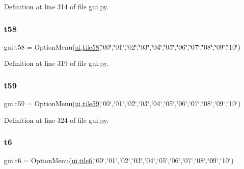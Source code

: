 Definition at line 314 of file gui.\+py.

\mbox{\label{namespacegui_a1b3b256d01a50dc355027775c504ea35}} 
\subsubsection{\texorpdfstring{t58}{t58}}
{\footnotesize\ttfamily gui.\+t58 = Option\+Menu(\mbox{\hyperlink{namespacegui_a40ab7281456eadbea2dc2038f5c24fa1}{ui}},\mbox{\hyperlink{namespacegui_a99c90d661722beb1c379e2d9fc6169a4}{tile58}},\char`\"{}00\char`\"{},\char`\"{}01\char`\"{},\char`\"{}02\char`\"{},\char`\"{}03\char`\"{},\char`\"{}04\char`\"{},\char`\"{}05\char`\"{},\char`\"{}06\char`\"{},\char`\"{}07\char`\"{},\char`\"{}08\char`\"{},\char`\"{}09\char`\"{},\char`\"{}10\char`\"{})}



Definition at line 319 of file gui.\+py.

\mbox{\label{namespacegui_a380d67606f2286d1725df8cdc4caad7a}} 
\subsubsection{\texorpdfstring{t59}{t59}}
{\footnotesize\ttfamily gui.\+t59 = Option\+Menu(\mbox{\hyperlink{namespacegui_a40ab7281456eadbea2dc2038f5c24fa1}{ui}},\mbox{\hyperlink{namespacegui_a841a445f892ff85a173e8562fe380797}{tile59}},\char`\"{}00\char`\"{},\char`\"{}01\char`\"{},\char`\"{}02\char`\"{},\char`\"{}03\char`\"{},\char`\"{}04\char`\"{},\char`\"{}05\char`\"{},\char`\"{}06\char`\"{},\char`\"{}07\char`\"{},\char`\"{}08\char`\"{},\char`\"{}09\char`\"{},\char`\"{}10\char`\"{})}



Definition at line 324 of file gui.\+py.

\mbox{\label{namespacegui_a96de424b06e577384c741ad4e2615c2a}} 
\subsubsection{\texorpdfstring{t6}{t6}}
{\footnotesize\ttfamily gui.\+t6 = Option\+Menu(\mbox{\hyperlink{namespacegui_a40ab7281456eadbea2dc2038f5c24fa1}{ui}},\mbox{\hyperlink{namespacegui_a05831122e36776d57f98dedba4233034}{tile6}},\char`\"{}00\char`\"{},\char`\"{}01\char`\"{},\char`\"{}02\char`\"{},\char`\"{}03\char`\"{},\char`\"{}04\char`\"{},\char`\"{}05\char`\"{},\char`\"{}06\char`\"{},\char`\"{}07\char`\"{},\char`\"{}08\char`\"{},\char`\"{}09\char`\"{},\char`\"{}10\char`\"{})}



